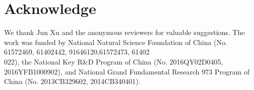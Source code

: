\documentclass[sigconf]{acmart}
\begin{document}
\section{Acknowledge}
We thank Jun Xu and the anonymous reviewers for valuable suggestions. The work was funded by National Natural Science Foundation of China (No. 61572469, 61402442, 91646120,61572473, 61402\\022), the National Key R\&D Program of China (No. 2016QY02D0405, 2016YFB1000902), and National Grand Fundamental Research 973 Program of China (No. 2013CB329602, 2014CB340401).


 


\end{document}
